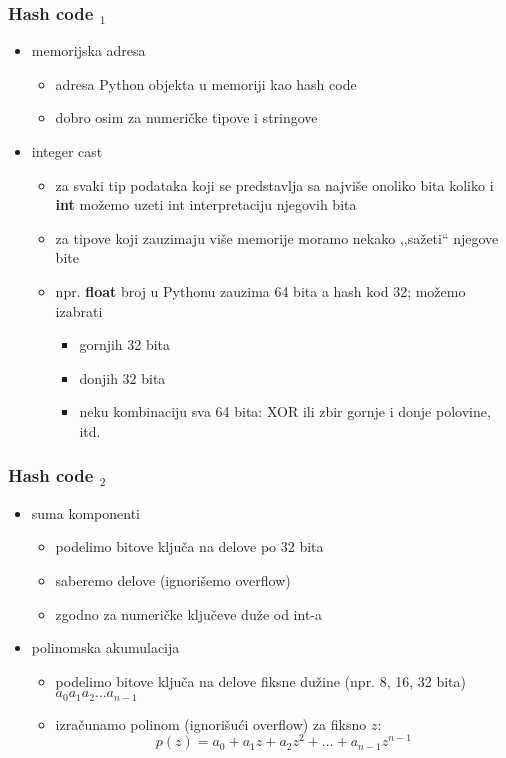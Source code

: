 \documentclass[compress]{beamer}
\begin{document}
\begin{frame}[fragile]
  \frametitle{Hash code $_1$}
  \begin{itemize}
    \item memorijska adresa
    \begin{itemize}
      \item adresa Python objekta u memoriji kao hash code
      \item dobro osim za numeričke tipove i stringove
    \end{itemize}
    \item integer cast 
    \begin{itemize}
      \item za svaki tip podataka koji se predstavlja sa najviše onoliko bita koliko i \textbf{int} možemo uzeti int interpretaciju njegovih bita
      \item za tipove koji zauzimaju više memorije moramo nekako ,,sažeti`` njegove bite
      \item npr. \textbf{float} broj u Pythonu zauzima 64 bita a hash kod 32; možemo izabrati
      \begin{itemize}
        \item gornjih 32 bita
        \item donjih 32 bita
        \item neku kombinaciju sva 64 bita: XOR ili zbir gornje i donje polovine, itd.
      \end{itemize}
    \end{itemize}
  \end{itemize}
\end{frame}

\begin{frame}[fragile]
  \frametitle{Hash code $_2$}
  \begin{itemize}
    \item suma komponenti
    \begin{itemize}
      \item podelimo bitove ključa na delove po 32 bita
      \item saberemo delove (ignorišemo overflow)
      \item zgodno za numeričke ključeve duže od int-a
    \end{itemize}
    \item polinomska akumulacija
    \begin{itemize}
      \item podelimo bitove ključa na delove fiksne dužine (npr. 8, 16, 32 bita) $a_0 a_1 a_2 \ldots a_{n-1}$
      \item izračunamo polinom (ignorišući overflow) za fiksno $z$:
      $$ p(z) = a_0 + a_1 z + a_2 z^2 + \ldots + a_{n-1} z^{n-1}$$
    \end{itemize}
  \end{itemize}
\end{frame}
\end{document}
